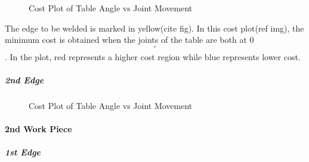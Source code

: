 \begin{figure}[!htbp] %
 \centering
   \caption{Cost Plot of Table Angle vs Joint Movement}
\label{fig:img17}
\end{figure}
The edge to be welded is marked in yellow(cite fig). In this cost plot(ref img), the minimum cost is obtained when the joints of the table are both at 0$$^{\circ}$$. In the plot, red represents a higher cost region while blue represents lower cost.
\subparagraph{2nd Edge}
\begin{figure}[!htbp] %
 \centering
   \caption{Cost Plot of Table Angle vs Joint Movement}
\label{fig:img18}
\end{figure}
\paragraph{2nd Work Piece}
\subparagraph{1st Edge}

